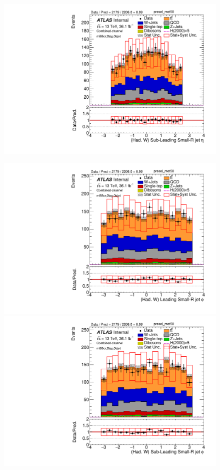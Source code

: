 \begin{figure}[!h]
\begin{center}
\includegraphics[scale=0.33]{./figures/boosted/PlotsInMbbCR/DataMC_2tag_0bjet_mbbcr_lepton_presel_met50_LightJet2Eta}\\
\par\medskip
\includegraphics[scale=0.33]{./figures/boosted/PlotsInMbbCR/DataMC_2tag_0bjet_mbbcr_lepton_presel_met50_LightJet1Phi}
\includegraphics[scale=0.33]{./figures/boosted/PlotsInMbbCR/DataMC_2tag_0bjet_mbbcr_lepton_presel_met50_LightJet2Phi}\\

\end{center}
\end{figure}
